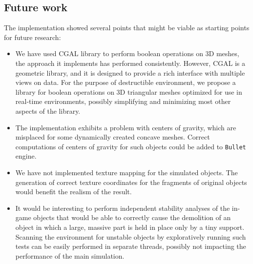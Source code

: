 \subsection*{Future work}
The implementation showed several points that might be viable as starting points for future research:
\begin{itemize}

\item We have used CGAL library to perform boolean operations on 3D meshes, the approach it implements has performed consistently. However, CGAL is a geometric library, and it is designed to provide a rich interface with multiple views on data. For the purpose of destructible environment, we propose a library for boolean operations on 3D triangular meshes optimized for use in real-time environments, possibly simplifying and minimizing most other aspects of the library.

\item The implementation exhibits a problem with centers of gravity, which are misplaced for some dynamically created concave meshes. Correct computations of centers of gravity for such objects could be added to \texttt{Bullet} engine.

\item We have not implemented texture mapping for the simulated objects. The generation of correct texture coordinates for the fragments of original objects would benefit the realism of the result.

\item It would be interesting to perform independent stability analyses of the in-game objects that would be able to \eg correctly cause the demolition of an object in which a large, massive part is held in place only by a tiny support. Scanning the environment for unstable objects by exploratively running such tests can be easily performed in separate threads, \ie possibly not impacting the performance of the main simulation.


\end{itemize}

